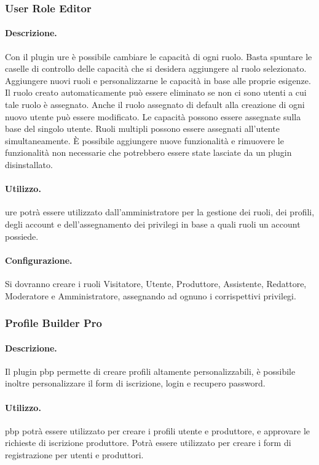 \subsubsection{User Role Editor} \label{plugin:ure}
\paragraph{Descrizione.} Con il plugin \gls{ure} è possibile cambiare le capacità di ogni ruolo. Basta spuntare le caselle di controllo delle capacità che si desidera aggiungere al ruolo selezionato. Aggiungere nuovi ruoli e personalizzarne le capacità in base alle proprie esigenze. Il ruolo creato automaticamente può essere eliminato se non ci sono utenti a cui tale ruolo è assegnato. Anche il ruolo assegnato di default alla creazione di ogni nuovo utente può essere modificato. Le capacità possono essere assegnate sulla base del singolo utente. Ruoli multipli possono essere assegnati all'utente simultaneamente. È possibile aggiungere nuove funzionalità e rimuovere le funzionalità non necessarie che potrebbero essere state lasciate da un plugin disinstallato.
\paragraph{Utilizzo.} \gls{ure} potrà essere utilizzato dall'amministratore per la gestione dei ruoli, dei profili, degli account e dell'assegnamento dei privilegi in base a quali ruoli un account possiede.
\paragraph{Configurazione.} Si dovranno creare i ruoli Visitatore, Utente, Produttore, Assistente, Redattore, Moderatore e Amministratore, assegnando ad ognuno i corrispettivi privilegi.

\subsubsection{Profile Builder Pro} \label{plugin:pbp}
\paragraph{Descrizione.} Il plugin \gls{pbp} permette di creare profili altamente personalizzabili, è possibile inoltre personalizzare il form di iscrizione, login e recupero password. 
\paragraph{Utilizzo.}  \gls{pbp} potrà essere utilizzato per creare i profili utente e produttore, e approvare le richieste di iscrizione produttore. Potrà essere utilizzato per creare i form di registrazione per utenti e produttori.
